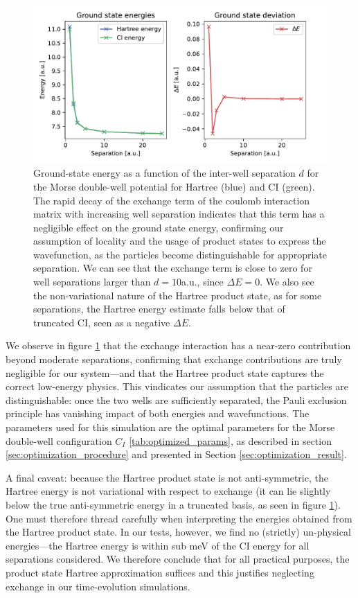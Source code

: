 \documentclass{subfiles}
\begin{document}
\begin{figure}[h!]
    \centering
    \includegraphics[width=1.0\textwidth]{figs/exchange_shift.pdf}
    \caption{Ground-state energy as a function of the inter-well separation $d$ for the Morse double-well potential for Hartree (blue) and CI (green). The rapid decay of the exchange term of the coulomb interaction matrix with increasing well separation indicates that this term has a negligible effect on the ground state energy, confirming our assumption of locality and the usage of product states to express the wavefunction, as the particles become distinguishable for appropriate separation. We can see that the exchange term is close to zero for well separations larger than $d = 10$a.u., since $\Delta E=0$. We also see the non-variational nature of the Hartree product state, as for some separations, the Hartree energy estimate falls below that of truncated CI, seen as a negative $\Delta E$.}
    \label{fig:exchange_shift}
\end{figure}
We observe in figure \ref{fig:exchange_shift} that the exchange interaction has a near-zero contribution beyond moderate separations, confirming that exchange contributions are truly negligible for our system—and that the Hartree product state captures the correct low-energy physics. This vindicates our assumption that the particles are distinguishable: once the two wells are sufficiently separated, the Pauli exclusion principle has vanishing impact of both energies and wavefunctions. The parameters used for this simulation are the optimal parameters for the Morse double-well configuration $C_I$ \ref{tab:optimized_params}, as described in section \ref{sec:optimization_procedure} and presented in Section \ref{sec:optimization_result}. 

A final caveat: because the Hartree product state is not anti-symmetric, the Hartree energy is not variational with respect to exchange (it can lie slightly below the true anti-symmetric energy in a truncated basis, as seen in figure \ref{fig:exchange_shift}). One must therefore thread carefully when interpreting the energies obtained from the Hartree product state. In our tests, however, we find no (strictly) un-physical energies—the Hartree energy is within sub meV of the CI energy for all separations considered. We therefore conclude that for all practical purposes, the product state Hartree approximation suffices and this justifies neglecting exchange in our time-evolution simulations.
\end{document}
